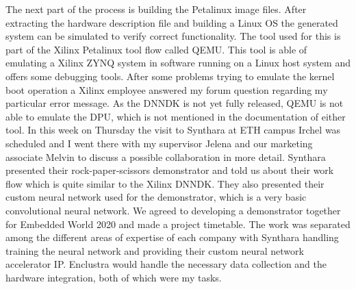 The next part of the process is building the Petalinux image files. After extracting the hardware description file and building a Linux \ac{OS} the generated system can be simulated to verify correct functionality. The tool used for this is part of the Xilinx Petalinux tool flow called \ac{QEMU}. This tool is able of emulating a Xilinx ZYNQ system in software running on a Linux host system and offers some debugging tools. After some problems trying to emulate the kernel boot operation a Xilinx employee answered my forum question regarding my particular error message. As the \ac{DNNDK} is not yet fully released, \ac{QEMU} is not able to emulate the \ac{DPU}, which is not mentioned in the documentation of either tool.
In this week on Thursday the visit to Synthara at ETH campus Irchel was scheduled and I went there with my supervisor Jelena and our marketing associate Melvin to discuss a possible collaboration in more detail. Synthara presented their rock-paper-scissors demonstrator and told us about their work flow which is quite similar to the Xilinx \ac{DNNDK}. They also presented their custom neural network used for the demonstrator, which is a very basic convolutional neural network. We agreed to developing a demonstrator together for Embedded World 2020 and made a project timetable. The work was separated among the different areas of expertise of each company with Synthara handling training the neural network and providing their custom neural network accelerator \ac{IP}. Enclustra would handle the necessary data collection and the hardware integration, both of which were my tasks.